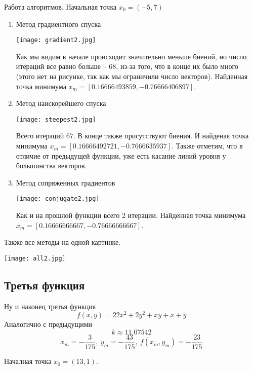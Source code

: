 Работа алгоритмов. Начальная точка $x_0 = (-5, 7)$
\newpage
\begin{enumerate}
    \item Метод градиентного спуска
    
    \texttt{[image: gradient2.jpg]}

    Как мы видим в начале происходит значительно меньше биений, но число
    итераций все равно больше -- 68, из-за того, что в конце их было много
    (этого нет на рисунке, так как мы ограничили число векторов).
    Найденная точка минимума $x_m = [0.16666493859, -0.76666406897]$.



    \item Метод наискорейшего спуска

    \texttt{[image: steepest2.jpg]}

    Всего итераций $67$. В конце также присутствуют биения. 
    И найденая точка минимума \newline $x_m = [0.16666492721, -0.7666635937]$.
    Также отметим, что в отличие от предыдущей функции, уже есть касание линий уровня у большинства векторов.
    \newpage
    \item Метод сопряженных градиентов
    
    \texttt{[image: conjugate2.jpg]}

    Как и на прошлой функции всего 2 итерации. Найденная точка минимума $x_m = [0.16666666667, -0.76666666667]$.

\end{enumerate}

Также все методы на одной картинке.

\texttt{[image: all2.jpg]}

\subsection{Третья функция}
Ну и наконец третья функция $$f(x, y) = 22x^2 + 2y^2 + xy + x + y$$
Аналогично с предыдущими
$$k \approx 11.07542$$
$$x_m = -\frac{3}{175},\ y_m = -\frac{43}{175},\ f(x_m, y_m) = -\frac{23}{175}$$

Началная точка $x_0 = (13, 1)$.


